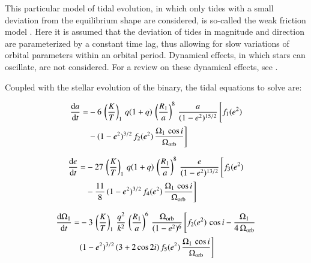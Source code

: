 \documentclass{aa}
\begin{document}
This particular model of tidal evolution, in which only tides with a small deviation from the equilibrium shape are considered, is
so-called the weak friction model \citep[see, e.g.,][]{darwin1879,alexander1973}. Here it is assumed that the deviation of tides in
magnitude and direction are parameterized by a constant time lag, thus allowing for slow variations of orbital parameters within an orbital
period. Dynamical effects, in which stars can oscillate, are not considered. For a review on these dynamical effects, see \citet{zahn1977}.

Coupled with the stellar evolution of the binary, the tidal equations to solve are:

\begin{equation}
   \begin{aligned}
      \dfrac{{\rm d}a}{{\rm d}t} = &-6 \, \left( \dfrac{K}{T} \right)_1 \, q (1 + q) \, \left( \dfrac{R_1}{a} \right)^8 \, \dfrac{a}{(1 - e^2)^{15/2}} \, \Bigg[ f_1(e^2) \\
                                   & - (1 - e^2)^{3/2} \, f_2(e^2) \, \dfrac{\Omega_1 \, \cos i}{\Omega_{\rm orb}} \Bigg]
   \end{aligned}
\end{equation}

\begin{equation}
   \begin{aligned}
      \dfrac{{\rm d}e}{{\rm d}t} = &-27 \, \left( \dfrac{K}{T} \right)_1 \, q (1 + q) \, \left( \dfrac{R_1}{a} \right)^8 \, \dfrac{e}{(1 - e^2)^{13/2}} \, \Bigg[ f_3(e^2) \\
                                   &- \dfrac{11}{8} \, (1 - e^2)^{3/2} \, f_4(e^2) \, \dfrac{\Omega_1 \, \cos i}{\Omega_{\rm orb}} \Bigg]
   \end{aligned}
\end{equation}

\begin{equation}
   \begin{aligned}
      \dfrac{{\rm d}\Omega_1}{{\rm d}t} = &-3 \, \left( \dfrac{K}{T} \right)_1 \, \dfrac{q^2}{k^2} \, \left( \dfrac{R_1}{a} \right)^6 \, \dfrac{\Omega_{\rm orb}}{(1 - e^2)^{6}}
      \, \Bigg[
      f_2(e^2) \, \cos i - \dfrac{\Omega_1}{4 \, \Omega_{\rm orb}} \\
                                        &(1 - e^2)^{3/2} \, (3 + 2 \cos 2i) \, f_5(e^2) \, \dfrac{\Omega_1 \, \cos i}{\Omega_{\rm orb}} \Bigg]
   \end{aligned}
\end{equation}
\end{document}
